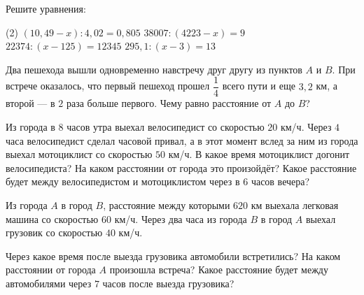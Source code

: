 \begin{homework}[number=2]
	\begin{listofex}
		\item Решите уравнения: %
		\begin{tasks}(2)
			\task \( (10,49-x):4,02=0,805 \)
			\task \( 38007:(4223-x)=9 \)
			\task \( 22374:(x-125)=12345 \)
			\task \( 295,1:(x-3)=13 \)
		\end{tasks}
		\item Два пешехода вышли одновременно навстречу друг другу из пунктов \(A\) и \(B\). При встрече оказалось, что первый пешеход прошел \(\dfrac{ 1 }{ 4 }\) всего пути и еще \(3,2\) км, а второй --- в \(2\) раза больше первого. Чему равно расстояние от \(A\) до \(B\)?
		\item Из города в \(8\) часов утра выехал велосипедист со скоростью \(20\) км/ч. Через \(4\) часа велосипедист сделал часовой привал, а в этот момент вслед за ним из города выехал мотоциклист со скоростью \(50\) км/ч. В какое время мотоциклист догонит велосипедиста? На каком расстоянии от города это произойдёт? Какое расстояние будет между велосипедистом и мотоциклистом через в \(6\) часов вечера?
		\item Из города \(A\) в город \(B\), расстояние между которыми \(620\) км выехала легковая машина со скоростью \(60\) км/ч. Через два часа из города \(B\) в город \(A\) выехал грузовик со скоростью \(40\) км/ч.
		\begin{tasks}
			\task Через какое время после выезда грузовика автомобили встретились? 
			\task На каком расстоянии от города \(A\) произошла встреча?
			\task Какое расстояние будет между автомобилями через \(7\) часов после выезда грузовика?
		\end{tasks}
	\end{listofex}
\end{homework}

